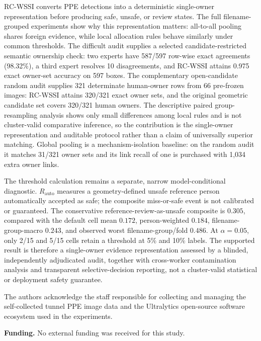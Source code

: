 \documentclass[iicol,pdflatex,sn-mathphys-num]{sn-jnl}
\begin{document}
RC-WSSI converts PPE detections into a deterministic single-owner representation before producing safe, unsafe, or review states. The full filename-grouped experiments show why this representation matters: all-to-all pooling shares foreign evidence, while local allocation rules behave similarly under common thresholds. The difficult audit supplies a selected candidate-restricted semantic ownership check: two experts have 587/597 row-wise exact agreements (98.32\%), a third expert resolves 10 disagreements, and RC-WSSI attains 0.975 exact owner-set accuracy on 597 boxes. The complementary open-candidate random audit supplies 321 determinate human-owner rows from 66 pre-frozen images: RC-WSSI attains 320/321 exact owner sets, and the original geometric candidate set covers 320/321 human owners. The descriptive paired group-resampling analysis shows only small differences among local rules and is not cluster-valid comparative inference, so the contribution is the single-owner representation and auditable protocol rather than a claim of universally superior matching. Global pooling is a mechanism-isolation baseline: on the random audit it matches 31/321 owner sets and its link recall of one is purchased with 1,034 extra owner links.

The threshold calculation remains a separate, narrow model-conditional diagnostic. $R_{\mathrm{auto}}$ measures a geometry-defined unsafe reference person automatically accepted as safe; the composite miss-or-safe event is not calibrated or guaranteed. The conservative reference-review-as-unsafe composite is $0.305$, compared with the default cell mean $0.172$, person-weighted $0.184$, filename-group-macro $0.243$, and observed worst filename-group/fold $0.486$. At $\alpha=0.05$, only 2/15 and 5/15 cells retain a threshold at 5\% and 10\% labels. The supported result is therefore a single-owner evidence representation assessed by a blinded, independently adjudicated audit, together with cross-worker contamination analysis and transparent selective-decision reporting, not a cluster-valid statistical or deployment safety guarantee.

\backmatter

The authors acknowledge the staff responsible for collecting and managing the self-collected tunnel PPE image data and the Ultralytics open-source software ecosystem used in the experiments.


\textbf{Funding.} No external funding was received for this study.
\end{document}
